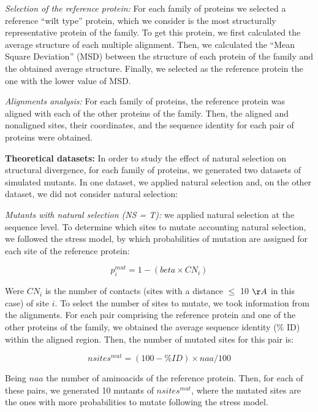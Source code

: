 \documentclass{article}
\begin{document}
{\it Selection of the reference protein:}
For each family of proteins we selected a reference ``wilt type'' protein, which we consider is the most structurally representative protein of the family. To get this protein, we first calculated the average structure of each multiple alignment. Then, we calculated the ``Mean Square Deviation'' (MSD) between the structure of each protein of the family and the obtained average structure. Finally, we selected as the reference protein the one with the lower value of MSD.

{\it Alignments analysis:}
For each family of proteins, the reference protein was aligned with each of the other proteins of the family. Then, the aligned and nonaligned sites, their coordinates, and the sequence identity for each pair of proteins were obtained. 

{\bf Theoretical datasets:}
In order to study the effect of natural selection on structural divergence, for each family of proteins, we generated two datasets of simulated mutants. In one dataset, we applied natural selection and, on the other dataset, we did not consider natural selection:

{\it Mutants with natural selection (NS = T):} we applied natural selection at the sequence level. To determine which sites to mutate accounting natural selection, we followed the stress model, by which probabilities of mutation are assigned for each site of the reference protein:

\begin{equation}
p^{mut}_{i} = 1 - (beta \times CN_{i})
\end{equation}

Were $CN_{i}$ is the number of contacts (sites with a distance $\leq$ 10 $\AA$ in this case) of site $i$. 
To select the number of sites to mutate, we took information from the alignments. For each pair comprising the reference protein and one of the other proteins of the family, we obtained the average sequence identity (\% ID) within the aligned region. Then, the number of mutated sites for this pair is: 

\begin{equation}
nsites^{mut} = (100 - \% ID) \times naa / 100
\end{equation}

Being $naa$ the number of aminoacids of the reference protein. 
Then, for each of these pairs, we generated 10 mutants of $nsites^{mut}$, where the mutated sites are the ones with more probabilities to mutate following the stress model.
 
\end{document}
